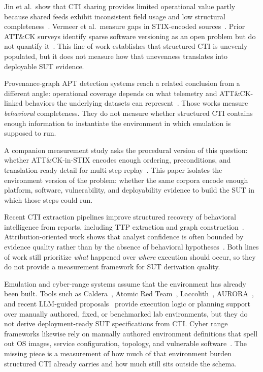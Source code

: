 \documentclass[sigconf]{acmart}
\newcommand{\caldera}{Caldera\xspace}
\begin{document}
Jin et al.\ show that CTI sharing provides limited operational value partly because shared feeds exhibit inconsistent field usage and low structural completeness~\cite{DBLP:conf/ndss/JinKLBKK24}. Vermeer et al.\ measure gaps in STIX-encoded sources~\cite{vermeer2022evolution}. Prior ATT\&CK surveys identify sparse software versioning as an open problem but do not quantify it~\cite{strom2018mitre,DBLP:conf/uss/VirkudIR00024,furumoto2025ctisurvey}. This line of work establishes that structured CTI is unevenly populated, but it does not measure how that unevenness translates into deployable SUT evidence.

Provenance-graph APT detection systems reach a related conclusion from a different angle: operational coverage depends on what telemetry and ATT\&CK-linked behaviors the underlying datasets can represent~\cite{milajerdi2019holmes,han2020unicorn,DBLP:conf/uss/Dong0NS0LLX23,DBLP:conf/uss/YangXXLZ23,Li_2024,DBLP:conf/uss/JiaXN0ZW24,DBLP:conf/uss/Zhang0YK0KF25}. Those works measure \emph{behavioral} completeness. They do not measure whether structured CTI contains enough information to instantiate the environment in which emulation is supposed to run.

A companion measurement study asks the procedural version of this question: whether ATT\&CK-in-STIX encodes enough ordering, preconditions, and translation-ready detail for multi-step replay~\cite{ferraz2026proceduralsemanticsgapstructured}. This paper isolates the environment version of the problem: whether the same corpora encode enough platform, software, vulnerability, and deployability evidence to build the SUT in which those steps could run.

Recent CTI extraction pipelines improve structured recovery of behavioral intelligence from reports, including TTP extraction and graph construction~\cite{savat2021extractor,DBLP:journals/corr/abs-2412-10872,cheng2025ctinexus,DBLP:conf/uss/BuchelPLCZBE0GC25}. Attribution-oriented work shows that analyst confidence is often bounded by evidence quality rather than by the absence of behavioral hypotheses~\cite{DBLP:conf/uss/SahaMBCVL25,DBLP:conf/ccs/YuldoshkhujaevJ25}. Both lines of work still prioritize \emph{what} happened over \emph{where} execution should occur, so they do not provide a measurement framework for SUT derivation quality.

Emulation and cyber-range systems assume that the environment has already been built. Tools such as \caldera{}~\cite{applebaum2016caldera}, Atomic Red Team~\cite{redcanary2023art}, Laccolith~\cite{orbinato2024laccolith}, AURORA~\cite{wang2024sands}, and recent LLM-guided proposals~\cite{singer2025incalmo,deng2024pentestgpt,shen2025pentestagent} provide execution logic or planning support over manually authored, fixed, or benchmarked lab environments, but they do not derive deployment-ready SUT specifications from CTI. Cyber range frameworks likewise rely on manually authored environment definitions that spell out OS images, service configuration, topology, and vulnerable software~\cite{orbinato2024laccolith,damodaran2025automated}. The missing piece is a measurement of how much of that environment burden structured CTI already carries and how much still sits outside the schema.
\end{document}
